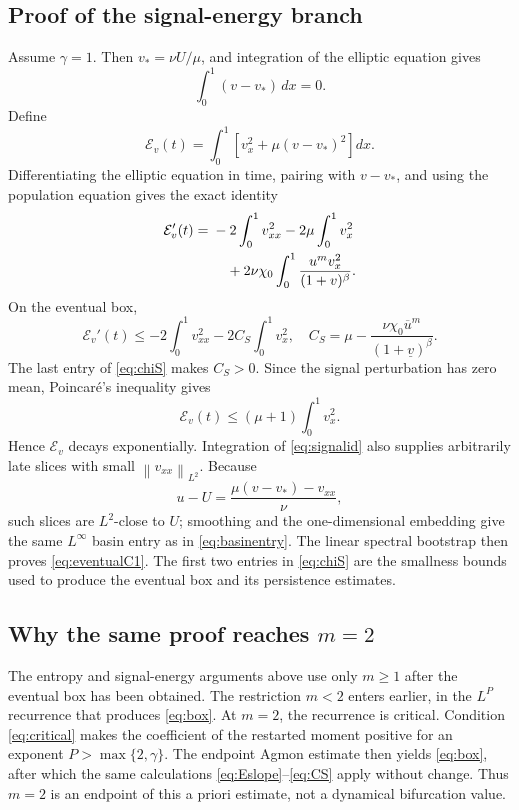 \documentclass[11pt]{article}
\newcommand{\norm}[1]{\left\lVert #1\right\rVert}
\begin{document}
\subsection{Proof of the signal-energy branch}

Assume \(\gamma=1\).  Then \(v_*=\nu U/\mu\), and integration of the elliptic
equation gives
\[
 \int_0^1(v-v_*)\,dx=0.
\]
Define
\begin{equation}
 \mathcal E_v(t)=\int_0^1
 \left[v_x^2+\mu(v-v_*)^2\right]dx.                    \label{eq:signalE}
\end{equation}
Differentiating the elliptic equation in time, pairing with \(v-v_*\), and
using the population equation gives the exact identity
\begin{align}
 \mathcal E_v'(t)
 ={}&-2\int_0^1v_{xx}^2
     -2\mu\int_0^1v_x^2 \notag\\
 &\quad
 +2\nu\chi_0\int_0^1
 \frac{u^m v_x^2}{(1+v)^\beta}.                        \label{eq:signalid}
\end{align}
On the eventual box,
\[
 \mathcal E_v'(t)
 \le-2\int_0^1v_{xx}^2-2C_S\int_0^1v_x^2,
\quad
 C_S=\mu-\frac{\nu\chi_0\overline u^m}
 {(1+\underline v)^\beta}.                             \label{eq:CS}
\]
The last entry of \eqref{eq:chiS} makes \(C_S>0\).  Since the signal
perturbation has zero mean, Poincaré's inequality gives
\[
 \mathcal E_v(t)\le(\mu+1)\int_0^1v_x^2.
\]
Hence \(\mathcal E_v\) decays exponentially.  Integration of
\eqref{eq:signalid} also supplies arbitrarily late slices with small
\(\norm{v_{xx}}_{L^2}\).  Because
\[
 u-U=\frac{\mu(v-v_*)-v_{xx}}{\nu},
\]
such slices are \(L^2\)-close to \(U\); smoothing and the one-dimensional
embedding give the same \(L^\infty\) basin entry as in
\eqref{eq:basinentry}.  The linear spectral bootstrap then proves
\eqref{eq:eventualC1}.  The first two entries in \eqref{eq:chiS} are the
smallness bounds used to produce the eventual box and its persistence
estimates.

\subsection{Why the same proof reaches \(m=2\)}

The entropy and signal-energy arguments above use only \(m\ge1\) after the
eventual box has been obtained.  The restriction \(m<2\) enters earlier, in
the \(L^P\) recurrence that produces \eqref{eq:box}.  At \(m=2\), the
recurrence is critical.  Condition \eqref{eq:critical} makes the coefficient
of the restarted moment positive for an exponent \(P>\max\{2,\gamma\}\).
The endpoint Agmon estimate then yields \eqref{eq:box}, after which the same
calculations \eqref{eq:Eslope}--\eqref{eq:CS} apply without change.  Thus
\(m=2\) is an endpoint of this a priori estimate, not a dynamical
bifurcation value.
\end{document}
